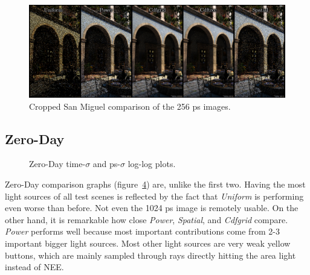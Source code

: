 \begin{figure}
    \centering
    \includegraphics[width=1\textwidth]{figures/comparisons/Mig_comp_same_slimmer.pdf}
    \caption{Cropped San Miguel comparison of the 256 ps images.}
    \label{fig:migcomp}
\end{figure}

\FloatBarrier
\subsection{Zero-Day}

\begin{figure}
    \centering
    \begin{subfigure}{.5\textwidth}
      \centering
        \caption{}
        \label{fig:zd_t}
    \end{subfigure}%
    \begin{subfigure}{.5\textwidth}
        \caption{}
        \label{fig:zd_ps}
    \end{subfigure}
    \caption{Zero-Day time-$\sigma$ and ps-$\sigma$ log-log plots.}
    \label{fig:zd}
\end{figure}

Zero-Day comparison graphs (figure~\ref{fig:zd}) are, unlike the first two. Having the most light sources of all test scenes is reflected by the fact that \textit{Uniform} is performing even worse than before. Not even the 1024 ps image is remotely usable. On the other hand, it is remarkable how close \textit{Power}, \textit{Spatial}, and \textit{Cdfgrid} compare. \textit{Power} performs well because most important contributions come from 2-3 important bigger light sources. Most other light sources are very weak yellow buttons, which are mainly sampled through rays directly hitting the area light instead of NEE.

